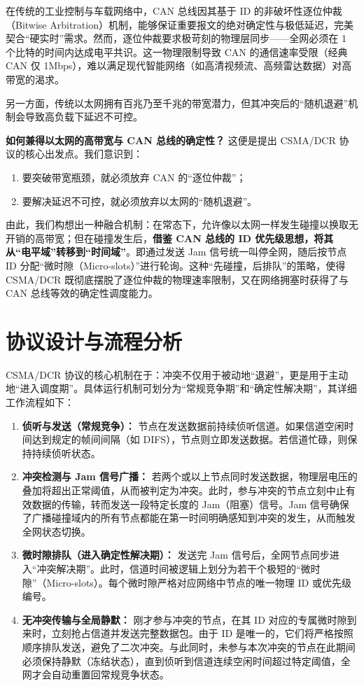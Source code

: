 \documentclass[12pt]{article}
\begin{document}
在传统的工业控制与车载网络中，CAN 总线因其基于 ID 的非破坏性逐位仲裁（Bitwise Arbitration）机制，能够保证重要报文的绝对确定性与极低延迟，完美契合“硬实时”需求。然而，逐位仲裁要求极苛刻的物理层同步——全网必须在 1 个比特的时间内达成电平共识。这一物理限制导致 CAN 的通信速率受限（经典 CAN 仅 1Mbps），难以满足现代智能网络（如高清视频流、高频雷达数据）对高带宽的渴求。

另一方面，传统以太网拥有百兆乃至千兆的带宽潜力，但其冲突后的“随机退避”机制会导致高负载下延迟不可控。

\textbf{如何兼得以太网的高带宽与 CAN 总线的确定性？} 这便是提出 CSMA/DCR 协议的核心出发点。我们意识到：
\begin{enumerate}
	\item 要突破带宽瓶颈，就必须放弃 CAN 的“逐位仲裁”；
	\item 要解决延迟不可控，就必须放弃以太网的“随机退避”。
\end{enumerate}

由此，我们构想出一种融合机制：在常态下，允许像以太网一样发生碰撞以换取无开销的高带宽；但在碰撞发生后，\textbf{借鉴 CAN 总线的 ID 优先级思想，将其从“电平域”转移到“时间域”}。即通过发送 Jam 信号统一叫停全网，随后按节点 ID 分配“微时隙（Micro-slots）”进行轮询。这种“先碰撞，后排队”的策略，使得 CSMA/DCR 既彻底摆脱了逐位仲裁的物理速率限制，又在网络拥塞时获得了与 CAN 总线等效的确定性调度能力。

\section{协议设计与流程分析}
CSMA/DCR 协议的核心机制在于：冲突不仅用于被动地“退避”，更是用于主动地“进入调度期”。具体运行机制可划分为“常规竞争期”和“确定性解决期”，其详细工作流程如下：
\begin{enumerate}
	\item \textbf{侦听与发送（常规竞争）：} 节点在发送数据前持续侦听信道。如果信道空闲时间达到规定的帧间间隔（如 DIFS），节点则立即发送数据。若信道忙碌，则保持持续侦听状态。
	\item \textbf{冲突检测与 Jam 信号广播：} 若两个或以上节点同时发送数据，物理层电压的叠加将超出正常阈值，从而被判定为冲突。此时，参与冲突的节点立刻中止有效数据的传输，转而发送一段特定长度的 Jam（阻塞）信号。Jam 信号确保了广播碰撞域内的所有节点都能在第一时间明确感知到冲突的发生，从而触发全网状态切换。
	\item \textbf{微时隙排队（进入确定性解决期）：} 发送完 Jam 信号后，全网节点同步进入“冲突解决期”。此时，信道时间被逻辑上划分为若干个极短的“微时隙”（Micro-slots）。每个微时隙严格对应网络中节点的唯一物理 ID 或优先级编号。
	\item \textbf{无冲突传输与全局静默：} 刚才参与冲突的节点，在其 ID 对应的专属微时隙到来时，立刻抢占信道并发送完整数据包。由于 ID 是唯一的，它们将严格按照顺序排队发送，避免了二次冲突。与此同时，未参与本次冲突的节点在此期间必须保持静默（冻结状态），直到侦听到信道连续空闲时间超过特定阈值，全网才会自动重置回常规竞争状态。
\end{enumerate}
\end{document}
